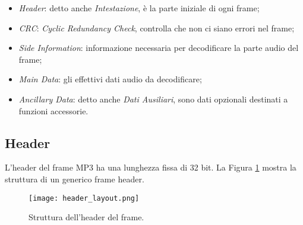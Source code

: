 		\begin{itemize}
			\item \textit{Header}: detto anche \textit{Intestazione}, è la parte iniziale di ogni frame;
			\item \textit{CRC}: \textit{Cyclic Redundancy Check}, controlla che non ci siano errori nel frame;
			\item \textit{Side Information}: informazione necessaria per decodificare la parte audio del frame;
			\item \textit{Main Data}: gli effettivi dati audio da decodificare;
			\item \textit{Ancillary Data}: detto anche \textit{Dati Ausiliari}, sono dati opzionali destinati a funzioni accessorie.
		\end{itemize}
		
		\subsection{Header} \label{subsec:header}
		
			L'header del frame MP3 ha una lunghezza fissa di 32 bit. La Figura \ref{fig:header_layout} mostra la struttura di un generico frame header.\\
			
			\begin{figure}[h!]
				\centering
					\texttt{[image: header\_layout.png]}
				\caption{Struttura dell'header del frame.}
				\label{fig:header_layout}
			\end{figure}
		
